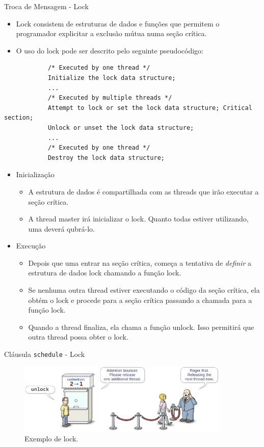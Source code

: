 	\begin{frame}[fragile]{Troca de Mensagem -  Lock}
		\begin{itemize}
			\item Lock consistem de estruturas de dados e funções que permitem o programador explicitar a exclusão mútua numa seção crítica.
			\item O uso do lock pode ser descrito pelo seguinte pseudocódigo:
		\end{itemize}
		\begin{verbatim}
			/* Executed by one thread */
			Initialize the lock data structure;
			...
			/* Executed by multiple threads */
			Attempt to lock or set the lock data structure; Critical section;
			Unlock or unset the lock data structure;
			...
			/* Executed by one thread */
			Destroy the lock data structure;
		\end{verbatim}
		\begin{itemize}
			\item Inicialização
			\begin{itemize}
				\item A estrutura de dados é compartilhada com as threads que irão executar a seção crítica.
				\item A thread master irá inicializar o lock. Quanto todas estiver utilizando, uma deverá qubrá-lo.
			\end{itemize}
			\item Execução
			\begin{itemize}
				\item Depois que uma entrar na seção crítica, começa a tentativa de \textit{definir} a estrutura de dados lock chamando a função lock.
				\item Se nenhuma outra thread estiver executando o código da seção crítica, ela obtém o lock e procede para a seção crítica passando a chamada para a função lock.
				\item Quando a thread finaliza, ela chama a função unlock. Isso permitirá que outra thread possa obter o lock.
			\end{itemize}
		\end{itemize}
\end{frame}

	\begin{frame}{Cláusula {\tt schedule} - Lock}
		\begin{figure}[p]
			\centering
			\includegraphics[width=0.9\textwidth]{img/pacheco/mutex.png}
			\caption{Exemplo de lock.}
		\end{figure}
	\end{frame}

